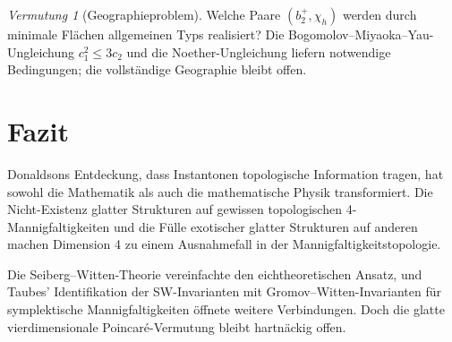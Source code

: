 \documentclass[12pt,a4paper]{amsart}
\theoremstyle{definition}
\theoremstyle{remark}
\newtheorem{vermutung}[theorem]{Vermutung}
\begin{document}
\begin{vermutung}[Geographieproblem]
Welche Paare $(b_2^+, \chi_h)$ werden durch minimale Flächen allgemeinen
Typs realisiert?  Die Bogomolov--Miyaoka--Yau-Ungleichung $c_1^2 \le 3c_2$
und die Noether-Ungleichung liefern notwendige Bedingungen; die vollständige
Geographie bleibt offen.
\end{vermutung}

\section{Fazit}

Donaldsons Entdeckung, dass Instantonen topologische Information tragen,
hat sowohl die Mathematik als auch die mathematische Physik transformiert.
Die Nicht-Existenz glatter Strukturen auf gewissen topologischen
4-Mannigfaltigkeiten und die Fülle exotischer glatter Strukturen auf anderen
machen Dimension 4 zu einem Ausnahmefall in der Mannigfaltigkeitstopologie.

Die Seiberg--Witten-Theorie vereinfachte den eichtheoretischen Ansatz,
und Taubes' Identifikation der SW-Invarianten mit
Gromov--Witten-Invarianten für symplektische Mannigfaltigkeiten öffnete
weitere Verbindungen.  Doch die glatte vierdimensionale Poincaré-Vermutung
bleibt hartnäckig offen.
\end{document}
